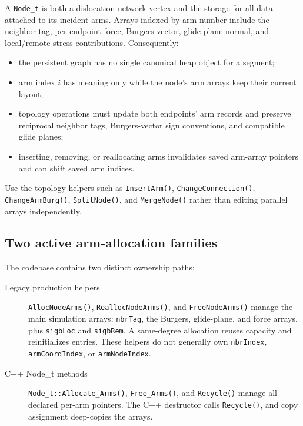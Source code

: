 \documentclass[11pt]{article}
\newcommand{\code}[1]{\texorpdfstring{\nolinkurl{#1}}{#1}}
\begin{document}


A \code{Node_t} is both a dislocation-network vertex and the storage for all
data attached to its incident arms.  Arrays indexed by arm number include the
neighbor tag, per-endpoint force, Burgers vector, glide-plane normal, and
local/remote stress contributions.  Consequently:

\begin{itemize}
\item the persistent graph has no single canonical heap object for a
segment;
\item arm index \(i\) has meaning only while the node's arm arrays keep their
current layout;
\item topology operations must update both endpoints' arm records and preserve
reciprocal neighbor tags, Burgers-vector sign conventions, and compatible
glide planes;
\item inserting, removing, or reallocating arms invalidates saved arm-array
pointers and can shift saved arm indices.
\end{itemize}

Use the topology helpers such as \code{InsertArm()},
\code{ChangeConnection()}, \code{ChangeArmBurg()}, \code{SplitNode()}, and
\code{MergeNode()} rather than editing parallel arrays independently.

\subsection{Two active arm-allocation families}

The codebase contains two distinct ownership paths:

\begin{description}
\item[Legacy production helpers]
\code{AllocNodeArms()}, \code{ReallocNodeArms()}, and \code{FreeNodeArms()}
manage the main simulation arrays: \code{nbrTag}, the Burgers, glide-plane,
and force arrays, plus \code{sigbLoc} and \code{sigbRem}.  A same-degree
allocation reuses capacity and reinitializes entries.  These helpers do not
generally own \code{nbrIndex}, \code{armCoordIndex}, or
\code{armNodeIndex}.

\item[C++ Node\_t methods]
\code{Node_t::Allocate_Arms()}, \code{Free_Arms()}, and \code{Recycle()}
manage all declared per-arm pointers.  The C++ destructor calls
\code{Recycle()}, and copy assignment deep-copies the arrays.
\end{description}
\end{document}
